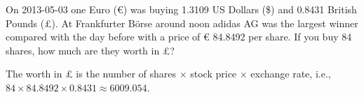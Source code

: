 

\begin{question}
On 2013-05-03 one Euro (€) was buying
1.3109 US Dollars (\$) and
0.8431 British Pounds (£).
At Frankfurter Börse around noon adidas AG was the largest winner
compared with the day before with a price of
€ 84.8492 per share.
If you buy 84 shares, how much are they worth in
£?
\end{question}

\begin{solution}
The worth in £ is the
number of shares $\times$ stock price $\times$ exchange rate, i.e.,
$84 \times 84.8492 \times 0.8431 \approx 6009.054$.
\end{solution}

